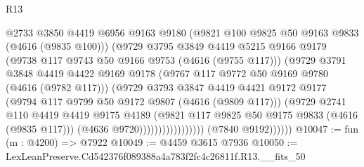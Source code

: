 \begin{lexlean}{R13}
\begin{coremodule}
                                      @2733
                                      @3850
                                      @4419
                                      @6956
                                      @9163
                                      @9180
                                      (@9821 @100 @9825 @50 @9163 @9833 (@4616 (@9835 @100)))
                                      (@9729
                                        @3795
                                        @3849
                                        @4419
                                        @5215
                                        @9166
                                        @9179
                                        (@9738 @117 @9743 @50 @9166 @9753 (@4616 (@9755 @117)))
                                        (@9729
                                          @3791
                                          @3848
                                          @4419
                                          @4422
                                          @9169
                                          @9178
                                          (@9767 @117 @9772 @50 @9169 @9780 (@4616 (@9782 @117)))
                                          (@9729
                                            @3793
                                            @3847
                                            @4419
                                            @4421
                                            @9172
                                            @9177
                                            (@9794 @117 @9799 @50 @9172 @9807 (@4616 (@9809 @117)))
                                            (@9729
                                              @2741
                                              @110
                                              @4419
                                              @4419
                                              @9175
                                              @4189
                                              (@9821
                                                @117
                                                @9825
                                                @50
                                                @9175
                                                @9833
                                                (@4616 (@9835 @117)))
                                              (@4636 @9720)))))))))))))))))
              (@7840 @9192))))))
@10047 := fun (m : @4200) => @7922
@10049 := @4459 @3615 @7936
@10050 := LexLeanPreserve.Cd542376f089388a4a783f2fc4c26811f.R13.__fits_50

\end{coremodule}
\end{lexlean}
